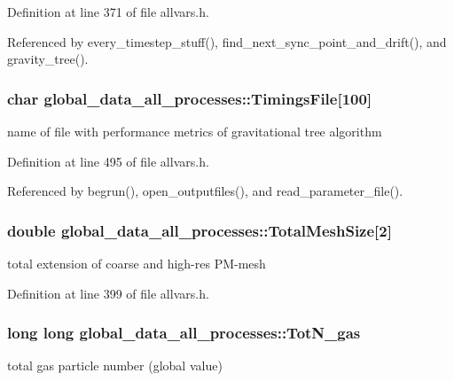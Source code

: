 Definition at line 371 of file allvars.h.



Referenced by every\_\-timestep\_\-stuff(), find\_\-next\_\-sync\_\-point\_\-and\_\-drift(), and gravity\_\-tree().

\hypertarget{structglobal__data__all__processes_ae0f7c691d211f8076374cc55271022e8}{
\subsubsection[{TimingsFile}]{\setlength{\rightskip}{0pt plus 5cm}char {\bf global\_\-data\_\-all\_\-processes::TimingsFile}\mbox{[}100\mbox{]}}}
\label{structglobal__data__all__processes_ae0f7c691d211f8076374cc55271022e8}
name of file with performance metrics of gravitational tree algorithm 

Definition at line 495 of file allvars.h.



Referenced by begrun(), open\_\-outputfiles(), and read\_\-parameter\_\-file().

\hypertarget{structglobal__data__all__processes_a1d2411089720f3ad0b8a294f5a693475}{
\subsubsection[{TotalMeshSize}]{\setlength{\rightskip}{0pt plus 5cm}double {\bf global\_\-data\_\-all\_\-processes::TotalMeshSize}\mbox{[}2\mbox{]}}}
\label{structglobal__data__all__processes_a1d2411089720f3ad0b8a294f5a693475}
total extension of coarse and high-\/res PM-\/mesh 

Definition at line 399 of file allvars.h.

\hypertarget{structglobal__data__all__processes_a2bb70816a4d5f56e0df2d9b8d706cef2}{
\subsubsection[{TotN\_\-gas}]{\setlength{\rightskip}{0pt plus 5cm}long long {\bf global\_\-data\_\-all\_\-processes::TotN\_\-gas}}}
\label{structglobal__data__all__processes_a2bb70816a4d5f56e0df2d9b8d706cef2}
total gas particle number (global value) 

